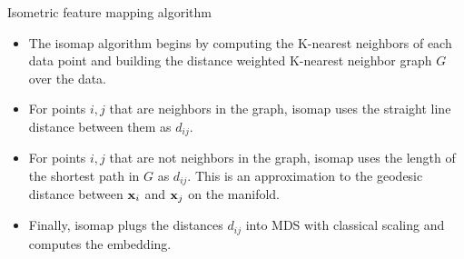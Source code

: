 \documentclass[serif,xcolor=pdftex,dvipsnames,table,hyperref={bookmarks=false,breaklinks}]{beamer}
\begin{document}
\begin{frame}[t]{Isometric feature mapping algorithm}
\begin{itemize}

\item The isomap algorithm begins by computing the K-nearest 
neighbors of each data point and building the distance weighted K-nearest 
neighbor graph $G$ over the data. 

\pause\item For points $i, j$ that are neighbors in the graph, isomap uses the 
straight line distance between them as $d_{ij}$.

\pause\item For points $i, j$ that are not neighbors in the graph, isomap uses 
the length of the shortest path in $G$ as $d_{ij}$. This is an approximation to
the geodesic distance between ${\mathbf{x}}_i$ and ${\mathbf{x}}_j$ on the manifold.

\pause\item Finally, isomap plugs the distances $d_{ij}$ into MDS with 
classical scaling and computes the embedding.

\end{itemize} 
\end{frame}
\end{document}
